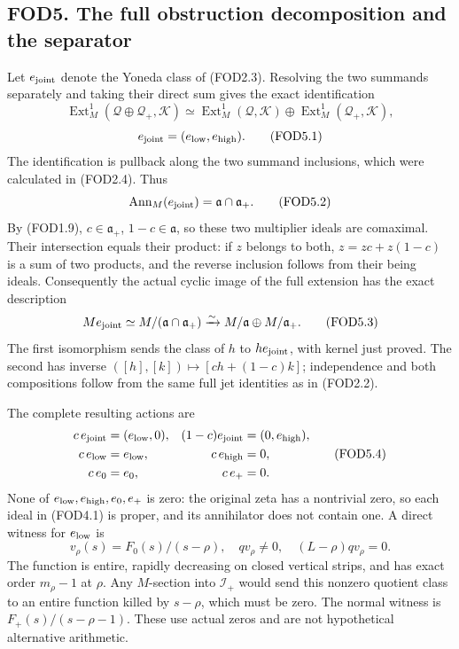 \subsection{FOD5. The full obstruction decomposition and the
separator}\label{fod5.-the-full-obstruction-decomposition-and-the-separator}

Let \(e_{\rm joint}\) denote the Yoneda class of (FOD2.3). Resolving the
two summands separately and taking their direct sum gives the exact
identification \[
\operatorname{Ext}^1_M(\mathcal Q\oplus\mathcal Q_+,\mathcal K)
\simeq
\operatorname{Ext}^1_M(\mathcal Q,\mathcal K)\oplus
\operatorname{Ext}^1_M(\mathcal Q_+,\mathcal K),
\] \[
e_{\rm joint}=(e_{\rm low},e_{\rm high}).
\tag{FOD5.1}
\] The identification is pullback along the two summand inclusions,
which were calculated in (FOD2.4). Thus \[
\operatorname{Ann}_M(e_{\rm joint})=\mathfrak a\cap\mathfrak a_+.
\tag{FOD5.2}
\] By (FOD1.9), \(c\in\mathfrak a_+\), \(1-c\in\mathfrak a\), so these
two multiplier ideals are comaximal. Their intersection equals their
product: if \(z\) belongs to both, \(z=zc+z(1-c)\) is a sum of two
products, and the reverse inclusion follows from their being ideals.
Consequently the actual cyclic image of the full extension has the exact
description \[
M e_{\rm joint}\simeq M/(\mathfrak a\cap\mathfrak a_+)
\xrightarrow{\sim}M/\mathfrak a\oplus M/\mathfrak a_+.
\tag{FOD5.3}
\] The first isomorphism sends the class of \(h\) to
\(h e_{\rm joint}\), with kernel just proved. The second has inverse
\(([h],[k])\mapsto[ch+(1-c)k]\); independence and both compositions
follow from the same full jet identities as in (FOD2.2).

The complete resulting actions are \[
\begin{aligned}
c\,e_{\rm joint}&=(e_{\rm low},0),&
(1-c)e_{\rm joint}&=(0,e_{\rm high}),\\
c\,e_{\rm low}&=e_{\rm low},&
c\,e_{\rm high}&=0,\\
c\,e_0&=e_0,&
c\,e_+&=0.
\end{aligned}
\tag{FOD5.4}
\] None of \(e_{\rm low},e_{\rm high},e_0,e_+\) is zero: the original
zeta has a nontrivial zero, so each ideal in (FOD4.1) is proper, and its
annihilator does not contain one. A direct witness for \(e_{\rm low}\)
is \[
v_\rho(s)=F_0(s)/(s-\rho),\quad qv_\rho\ne0,\quad
(L-\rho)qv_\rho=0.
\tag{FOD5.5}
\] The function is entire, rapidly decreasing on closed vertical strips,
and has exact order \(m_\rho-1\) at \(\rho\). Any \(M\)-section into
\(\mathcal I_+\) would send this nonzero quotient class to an entire
function killed by \(s-\rho\), which must be zero. The normal witness is
\(F_+(s)/(s-\rho-1)\). These use actual zeros and are not hypothetical
alternative arithmetic.

